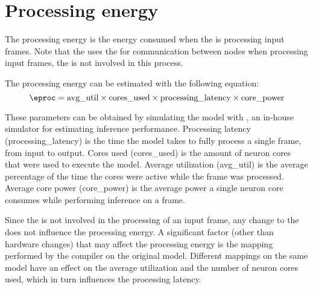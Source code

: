 \section{Processing energy}
The processing energy is the energy consumed when the \graicore{} is processing input frames.
Note that the \graicore{} uses the \eventnoc{} for communication between nodes when processing input frames, the \confignoc{} is not involved in this process.

The processing energy can be estimated with the following equation:
\begin{equation}
    \eproc = \textrm{avg\_util} \times \textrm{cores\_used} \times \textrm{processing\_latency} \times \textrm{core\_power}
\end{equation}

These parameters can be obtained by simulating the model with \graipefruit{}, an in-house simulator for estimating inference performance.
Processing latency (\textrm{processing\_latency}) is the time the model takes to fully process a single frame, from input to output.
Cores used (\textrm{cores\_used}) is the amount of neuron cores that were used to execute the model.
Average utilization (\textrm{avg\_util}) is the average percentage of the time the cores were active while the frame was processed. 
Average core power (\textrm{core\_power}) is the average power a single neuron core consumes while performing inference on a frame.

Since the \confignoc{} is not involved in the processing of an input frame, any change to the \confignoc{} does not influence the processing energy.
A significant factor (other than hardware changes) that may affect the processing energy is the mapping performed by the compiler on the original model. 
Different mappings on the same model have an effect on the average utilization and the number of neuron cores used, which in turn influences the processing latency.

